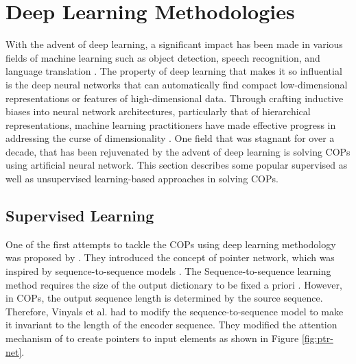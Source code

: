 \documentclass{article}
\begin{document}

\section{Deep Learning Methodologies}
With the advent of deep learning, a significant impact has been made in various fields of machine learning such as object detection, speech recognition, and language translation \cite{lecun2015deep}. The property of deep learning that makes it so influential is the deep neural networks that can automatically find compact low-dimensional representations or features of high-dimensional data. Through crafting inductive biases into neural network architectures, particularly that of hierarchical representations, machine learning practitioners have made effective progress in addressing the curse of dimensionality \cite{bengio2013representation}. One field that was stagnant for over a decade, that has been rejuvenated by the advent of deep learning is solving COPs using artificial neural network. This section describes some popular supervised as well as unsupervised learning-based approaches in solving COPs.  

\subsection{Supervised Learning}
One of the first attempts to tackle the COPs using deep learning methodology was proposed by \cite{vinyals2015pointer}. They introduced the concept of pointer network, which was inspired by sequence-to-sequence models \cite{sutskever2014sequence}. The Sequence-to-sequence learning method requires the size of the output dictionary to be fixed a priori \cite{vinyals2015pointer}. However, in COPs, the output sequence length is determined by the source sequence. Therefore, Vinyals et al. had to modify the sequence-to-sequence model to make it invariant to the length of the encoder sequence. They modified the attention mechanism of \cite{bahdanau2014neural} to create pointers to input elements as shown in Figure \ref{fig:ptr-net}.
\end{document}
